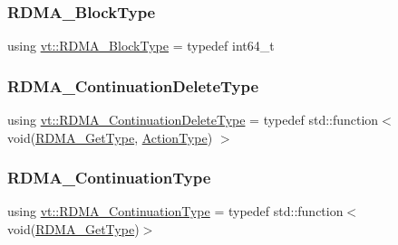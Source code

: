 \mbox{\label{namespacevt_ae54d2ca8f6bb4d65faf65118c82cd6f7}} 
\subsubsection{\texorpdfstring{R\+D\+M\+A\+\_\+\+Block\+Type}{RDMA\_BlockType}}
{\footnotesize\ttfamily using \hyperlink{namespacevt_ae54d2ca8f6bb4d65faf65118c82cd6f7}{vt\+::\+R\+D\+M\+A\+\_\+\+Block\+Type} = typedef int64\+\_\+t}

\mbox{\label{namespacevt_a4dfad0b5809d9812d60a0311a45ae0c2}} 
\subsubsection{\texorpdfstring{R\+D\+M\+A\+\_\+\+Continuation\+Delete\+Type}{RDMA\_ContinuationDeleteType}}
{\footnotesize\ttfamily using \hyperlink{namespacevt_a4dfad0b5809d9812d60a0311a45ae0c2}{vt\+::\+R\+D\+M\+A\+\_\+\+Continuation\+Delete\+Type} = typedef std\+::function$<$ void(\hyperlink{namespacevt_a1cab7f4860f65a49ad2c042d6240f288}{R\+D\+M\+A\+\_\+\+Get\+Type}, \hyperlink{namespacevt_ae0a5a7b18cc99d7b732cb4d44f46b0f3}{Action\+Type}) $>$}

\mbox{\label{namespacevt_a9880273f1697d78c2171f8d8f044de51}} 
\subsubsection{\texorpdfstring{R\+D\+M\+A\+\_\+\+Continuation\+Type}{RDMA\_ContinuationType}}
{\footnotesize\ttfamily using \hyperlink{namespacevt_a9880273f1697d78c2171f8d8f044de51}{vt\+::\+R\+D\+M\+A\+\_\+\+Continuation\+Type} = typedef std\+::function$<$void(\hyperlink{namespacevt_a1cab7f4860f65a49ad2c042d6240f288}{R\+D\+M\+A\+\_\+\+Get\+Type})$>$}

\mbox{\label{namespacevt_a2c2a902092b72056f70210c159f966f0}} 
